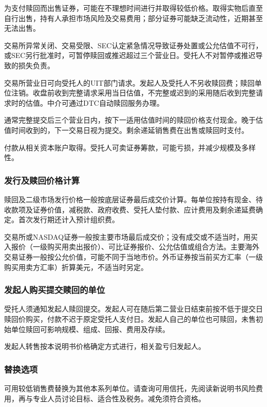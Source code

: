 \documentclass[UTF8,fontset=none,11pt,a4paper]{ctexart}
\begin{document}
为支付赎回而出售证券，可能在不理想时间进行并取得较低价格。取得实物后直至自行出售，持有人承担市场风险及交易费用；部分证券可能缺乏流动性，近期甚至\allowbreak\mbox{无法出售。}


交易所异常关闭、交易受限、SEC认定紧急情况导致证券处置或公允估值不可行，或SEC另行批准时，可暂停赎回或推迟超过三个营业日。受托人不对暂停或推迟导致的\allowbreak\mbox{损失负责。}


交易所营业日可向受托人的UIT部门请求。发起人及受托人不另收赎回费；赎回单位注销。收盘前收到完整请求采用当日估值，不完整或迟到的采用随后收到完整请求时的估值。中介可通过DTC自动赎回\allowbreak\mbox{服务办理。}


通常完整提交后三个营业日内，按下一适用估值时间的赎回价格支付现金。晚于估值时间收到的，下一交易日视为提交。剩余递延销售费在出售或赎\allowbreak\mbox{回时支付。}


付款从相关资本账户取得。受托人可卖证券筹款，可能亏损，并减少规模\allowbreak\mbox{及多样性。}


\subsubsection*{发行及赎回价格计算}
赎回及二级市场发行价格一般按底层证券最后成交价计算。每单位按持有现金、待收款项及证券价值，减税款、政府收费、受托人垫付款、应计费用及剩余递延费确定。首次发行期还计入预\allowbreak\mbox{计组织费。}


交易所或NASDAQ证券一般按主要市场最后成交价；没有成交或不适当时，用买入报价（一级购买用卖出报价）、可比证券报价、公允估值或组合方法。主要海外交易证券一般按公允价值，可能不同于当地市价。外币证券按当前买方汇率（一级购买用卖方汇率）折算美元，不适\allowbreak\mbox{当时另定。}


\subsubsection*{发起人购买提交赎回的单位}
受托人须通知发起人赎回提交。发起人可在随后第二营业日结束前按不低于提交日赎回价购买，付款不迟于原定受托人支付日。发起人自己的单位也可赎回，未售初始单位赎回可影响规模、组成、回报、费\allowbreak\mbox{用及存续。}


发起人转售按本说明书价格确定方式进行，相关盈亏\allowbreak\mbox{归发起人。}


\subsubsection*{替换选项}
可用较低销售费替换为其他本系列单位。请查询可用信托，先阅读新说明书风险费用，再与专业人员讨论目标、适合性及税务。减免须\allowbreak\mbox{符合资格。}
\end{document}
